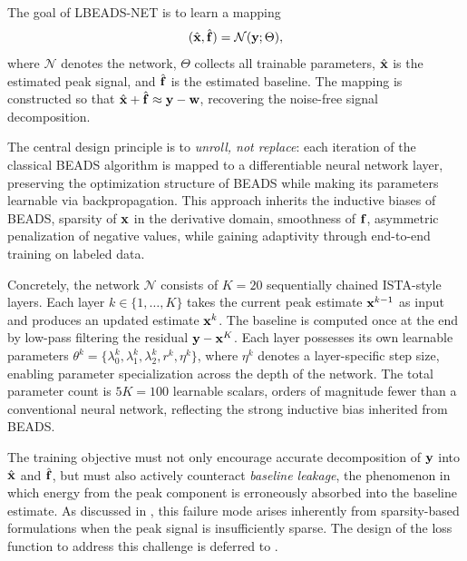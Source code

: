 The goal of LBEADS-NET is to learn a mapping
\begin{equation}
    (\hat{\mathbf{x}}, \hat{\mathbf{f}}) = \mathcal{N}(\mathbf{y}; \Theta),
    \label{eq:lbeads_mapping}
\end{equation}
where $\mathcal{N}$ denotes the network, $\Theta$ collects all trainable parameters, $\hat{\mathbf{x}}$ is the estimated peak signal, and $\hat{\mathbf{f}}$ is the estimated baseline. The mapping is constructed so that $\hat{\mathbf{x}} + \hat{\mathbf{f}} \approx \mathbf{y} - \mathbf{w}$, recovering the noise-free signal decomposition.

The central design principle is to \emph{unroll, not replace}: each iteration of the classical BEADS algorithm is mapped to a differentiable neural network layer, preserving the optimization structure of BEADS while making its parameters learnable via backpropagation. This approach inherits the inductive biases of BEADS, sparsity of $\mathbf{x}$ in the derivative domain, smoothness of $\mathbf{f}$, asymmetric penalization of negative values, while gaining adaptivity through end-to-end training on labeled data.

Concretely, the network $\mathcal{N}$ consists of $K = 20$ sequentially chained ISTA-style layers. Each layer $k \in \{1, \ldots, K\}$ takes the current peak estimate $\mathbf{x}^{k-1}$ as input and produces an updated estimate $\mathbf{x}^k$. The baseline is computed once at the end by low-pass filtering the residual $\mathbf{y} - \mathbf{x}^K$. Each layer possesses its own learnable parameters $\theta^k = \{\lambda_0^k, \lambda_1^k, \lambda_2^k, r^k, \eta^k\}$, where $\eta^k$ denotes a layer-specific step size, enabling parameter specialization across the depth of the network. The total parameter count is $5K = 100$ learnable scalars, orders of magnitude fewer than a conventional neural network, reflecting the strong inductive bias inherited from BEADS.

The training objective must not only encourage accurate decomposition of $\mathbf{y}$ into $\hat{\mathbf{x}}$ and $\hat{\mathbf{f}}$, but must also actively counteract \emph{baseline leakage}, the phenomenon in which energy from the peak component is erroneously absorbed into the baseline estimate. As discussed in , this failure mode arises inherently from sparsity-based formulations when the peak signal is insufficiently sparse. The design of the loss function to address this challenge is deferred to .



